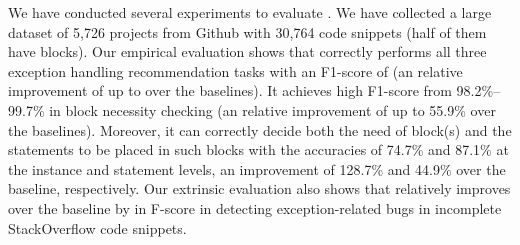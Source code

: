 %

We have conducted several experiments to evaluate {\tool}. We have
collected a large dataset of 5,726 projects from Github
with 30,764 code snippets (half of them have 
blocks). Our empirical evaluation shows that {\tool} correctly
performs all three exception handling recommendation tasks with an
F1-score of {\color{red}{\bf XX.X\%}} (an relative improvement of up
to {\color{red}{\bf XX.X\%}} over the baselines). It achieves high
F1-score from 98.2\%--99.7\% in  block necessity
checking (an relative improvement of up to 55.9\% over the
baselines). Moreover, it can correctly decide both the need of
 block(s) and the statements to be placed in such
blocks with the accuracies of 74.7\% and 87.1\% at the instance and
statement levels, an improvement of 128.7\% and 44.9\% over the
baseline, respectively. Our extrinsic evaluation also shows that
{\tool} relatively improves over the baseline by {\color{red}{\bf
    9.6\%}} in F-score in detecting exception-related bugs in
incomplete StackOverflow code snippets.

